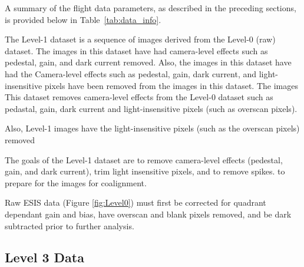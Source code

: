     
    	
    	
    	A summary of the flight data parameters, as described in the preceding sections, is provided below in Table~\ref{tab:data_info}. 
    	
    
        The Level-1 dataset is a sequence of images derived from the Level-0 (raw) dataset.
        The images in this dataset have had camera-level effects such as pedestal, gain, and dark current removed.
        Also, the images in this dataset have had the 
        Camera-level effects such as pedestal, gain, dark current, and light-insensitive pixels have been removed from the images in this dataset.
        The images 
        This dataset removes camera-level effects from the Level-0 dataset such as pedastal, gain, dark current and light-insensitive pixels (such as overscan pixels).
        
        
        Also, Level-1 images have the light-insensitive pixels (such as the overscan pixels) removed 
    
        The goals of the Level-1 dataset are to remove camera-level effects (pedestal, gain, and dark current), trim light insensitive pixels, and to remove spikes. to prepare for the images for coalignment.
    
       Raw ESIS data (Figure \ref{fig:Level0}) must first be corrected for quadrant dependant gain and bias, have overscan and blank pixels removed, and be dark subtracted prior to further analysis.
       
	       


    \subsection{Level 3 Data}
 

